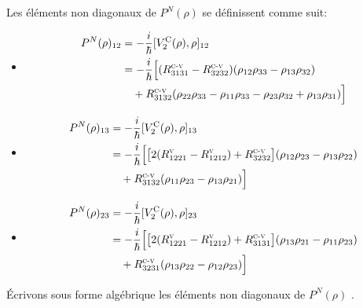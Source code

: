 \documentclass[12pt,a4paper,openany,oneside]{book}
\begin{document}
{{{{{{ Les éléments non diagonaux de $ P^{N}(\rho)$ se définissent comme suit:
 \begin{itemize}[label=$\bullet$]
 \item \begin{equation*}
  \begin{split}
P^{N}(\rho)_{12} &= -\dfrac{i}{\hbar}[V_{2}^{\textrm{C}}(\rho),\rho]_{12}\\
&= -\dfrac{i}{\hbar}\Big[(R^{\textsc{c-v}}_{3131}-R^{\textsc{c-v}}_{3232})( \rho_{12}\rho_{33} - \rho_{13}\rho_{32}) \\ 
& \quad + R^{\textsc{c-v}}_{3132}( \rho_{22}\rho_{33} -\rho_{11}\rho_{33}
 - \rho_{23}\rho_{32}+\rho_{13}\rho_{31})\Big]
\end{split}
\end{equation*}
 \item \begin{equation*}
  \begin{split}
P^{N}(\rho)_{13} &= -\dfrac{i}{\hbar}[V_{2}^{\textrm{C}}(\rho),\rho]_{13}\\
&= -\dfrac{i}{\hbar}\Big[\big[2(R^{\textsc{v}}_{1221}-R^{\textsc{v}}_{1212})+R^{\textsc{c-v}}_{3232}\big]( \rho_{12}\rho_{23} - \rho_{13}\rho_{22})\\
&\quad + R^{\textsc{c-v}}_{3132}( \rho_{11}\rho_{23} - \rho_{13}\rho_{21})\Big]
\end{split}
\end{equation*}
 \item \begin{equation*}
  \begin{split}
P^{N}(\rho)_{23} &= -\dfrac{i}{\hbar}[V_{2}^{\textrm{C}}(\rho),\rho]_{23}\\ 
&= -\dfrac{i}{\hbar}\Big[\big[2(R^{\textsc{v}}_{1221}-R^{\textsc{v}}_{1212})+ R^{\textsc{c-v}}_{3131}\big]( \rho_{13}\rho_{21} - \rho_{11}\rho_{23}) \\
&\quad + R^{\textsc{c-v}}_{3231}( \rho_{13}\rho_{22} - \rho_{12}\rho_{23})\Big]
\end{split}
\end{equation*}
 \end{itemize}
 
 
Écrivons sous forme algébrique les éléments non diagonaux de $ P^{N}(\rho)$ .\\

}}}}}}
\end{document}
